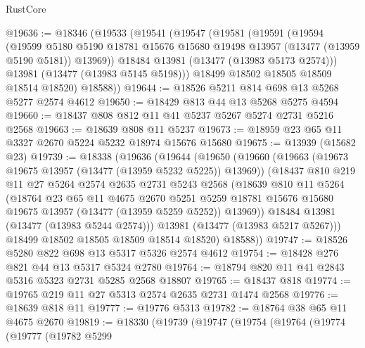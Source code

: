 \begin{lexlean}{RustCore}
\begin{coremodule}
@19636 := @18346
    (@19533
      (@19541
        (@19547
          (@19581
            (@19591
              (@19594
                (@19599
                  @5180
                  @5190
                  @18781
                  @15676
                  @15680
                  @19498
                  @13957
                  (@13477 (@13959 @5190 @5181))
                  @13969))
              @18484
              @13981
              (@13477 (@13983 @5173 @2574)))
            @13981
            (@13477 (@13983 @5145 @5198)))
          @18499
          @18502
          @18505
          @18509
          @18514
          @18520)
        @18588))
@19644 := @18526 @5211 @814 @698 @13 @5268 @5277 @2574 @4612
@19650 := @18429 @813 @44 @13 @5268 @5275 @4594
@19660 := @18437 @808 @812 @11 @41 @5237 @5267 @5274 @2731 @5216 @2568
@19663 := @18639 @808 @11 @5237
@19673 := @18959 @23 @65 @11 @3327 @2670 @5224 @5232 @18974 @15676 @15680
@19675 := @13939 (@15682 @23)
@19739 := @18338
    (@19636
      (@19644
        (@19650
          (@19660
            (@19663 (@19673 @19675 @13957 (@13477 (@13959 @5232 @5225)) @13969))
            (@18437
              @810
              @219
              @11
              @27
              @5264
              @2574
              @2635
              @2731
              @5243
              @2568
              (@18639
                @810
                @11
                @5264
                (@18764
                  @23
                  @65
                  @11
                  @4675
                  @2670
                  @5251
                  @5259
                  @18781
                  @15676
                  @15680
                  @19675
                  @13957
                  (@13477 (@13959 @5259 @5252))
                  @13969))
              @18484
              @13981
              (@13477 (@13983 @5244 @2574)))
            @13981
            (@13477 (@13983 @5217 @5267)))
          @18499
          @18502
          @18505
          @18509
          @18514
          @18520)
        @18588))
@19747 := @18526 @5280 @822 @698 @13 @5317 @5326 @2574 @4612
@19754 := @18428 @276 @821 @44 @13 @5317 @5324 @2780
@19764 := @18794 @820 @11 @41 @2843 @5316 @5323 @2731 @5285 @2568 @18807
@19765 := @18437 @818
@19774 := @19765 @219 @11 @27 @5313 @2574 @2635 @2731 @1474 @2568
@19776 := @18639 @818 @11
@19777 := @19776 @5313
@19782 := @18764 @38 @65 @11 @4675 @2670
@19819 := @18330
    (@19739
      (@19747
        (@19754
          (@19764
            (@19774
              (@19777
                (@19782
                  @5299

\end{coremodule}
\end{lexlean}

